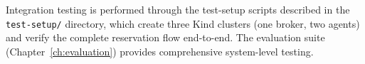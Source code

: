 Integration testing is performed through the test-setup scripts described in the \texttt{test-setup/} directory, which create three Kind clusters (one broker, two agents) and verify the complete reservation flow end-to-end. The evaluation suite (Chapter~\ref{ch:evaluation}) provides comprehensive system-level testing.
